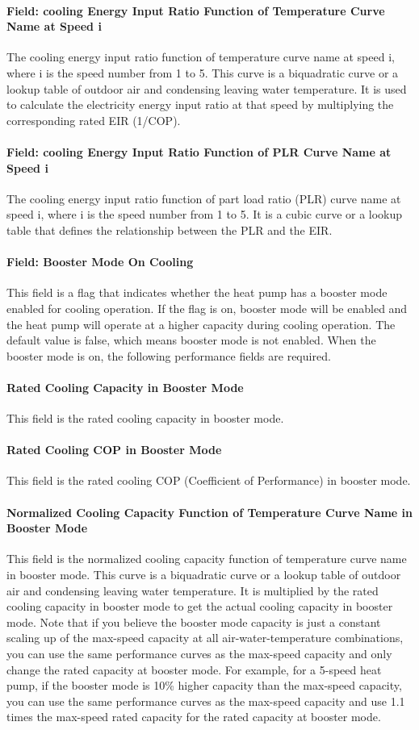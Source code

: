 \paragraph{Field: cooling Energy Input Ratio Function of Temperature Curve Name
at Speed i} The cooling energy input ratio function of temperature curve name at
speed i, where i is the speed number from 1 to 5. This curve is a biquadratic
curve or a lookup table of outdoor air and condensing leaving water temperature.
It is used to calculate the electricity energy input ratio at that speed by
multiplying the corresponding rated EIR (1/COP).
\paragraph{Field: cooling Energy Input Ratio Function of PLR Curve Name at Speed
i} The cooling energy input ratio function of part load ratio (PLR) curve name
at speed i, where i is the speed number from 1 to 5. It is a cubic curve or a
lookup table that defines the relationship between the PLR and the EIR.
\paragraph{Field: Booster Mode On Cooling} This field is a flag that indicates
whether the heat pump has a booster mode enabled for cooling operation. If the
flag is on, booster mode will be enabled and the heat pump will operate at a
higher capacity during cooling operation. The default value is false, which
means booster mode is not enabled. When the booster mode is on, the following
performance fields are required.
\paragraph{Rated Cooling Capacity in Booster Mode} This field is the rated
cooling capacity in booster mode.
\paragraph{Rated Cooling COP in Booster Mode} This field is the rated cooling
COP (Coefficient of Performance) in booster mode.
\paragraph{Normalized Cooling Capacity Function of Temperature Curve Name in
Booster Mode} This field is the normalized cooling capacity function of
temperature curve name in booster mode. This curve is a biquadratic curve or a
lookup table of outdoor air and condensing leaving water temperature. It is
multiplied by the rated cooling capacity in booster mode to get the actual
cooling capacity in booster mode. Note that if you believe the booster mode
capacity is just a constant scaling up of the max-speed capacity at all
air-water-temperature combinations, you can use the same performance curves as
the max-speed capacity and only change the rated capacity at booster mode.
For example, for a 5-speed heat pump, if the booster mode is 10\% higher capacity
than the max-speed capacity, you can use the same performance curves as the max-speed
capacity and use 1.1 times the max-speed rated capacity for the rated capacity at booster mode.
